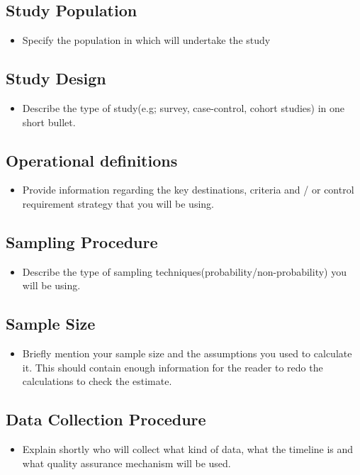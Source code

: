 \documentclass[10pt, a4paper]{article}
\begin{document}
\subsection*{Study Population}
\begin{itemize}
	\item Specify the population in which will undertake the study
\end{itemize}
\subsection*{Study Design}
\begin{itemize}
	\item Describe the type of study(e.g; survey, case-control, cohort studies) in one short bullet.
\end{itemize}
\subsection*{Operational definitions}
\begin{itemize}
	\item Provide information regarding the key destinations, criteria and / or control requirement strategy that you will be using. 
\end{itemize}

\subsection*{Sampling Procedure}
\begin{itemize}
	\item Describe the type of sampling techniques(probability/non-probability) you will be using.  
\end{itemize}

\subsection*{Sample Size}
\begin{itemize}
	\item Briefly mention your sample size and the assumptions you used to calculate it. This should contain enough information for the reader to redo the calculations to check the estimate.  
\end{itemize}
\subsection*{Data Collection Procedure}
\begin{itemize}
	\item Explain shortly who will collect what kind of data, what the timeline is and what quality assurance mechanism will be used.
\end{itemize}
\end{document}
